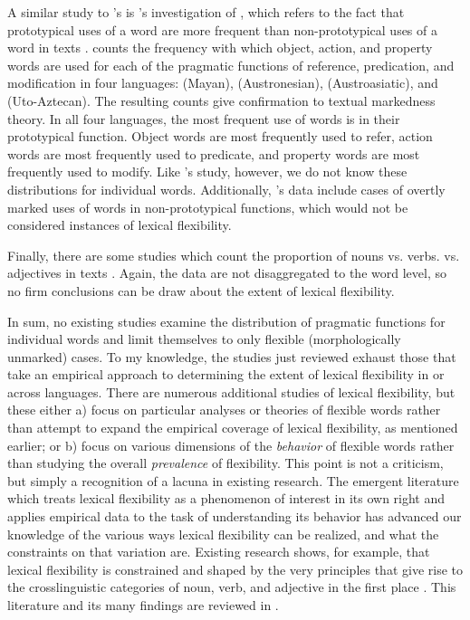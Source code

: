 A similar study to \citeauthor{Thompson1989}'s is \citeauthor{Croft1991}'s \parencite*[§2.5]{Croft1991} investigation of , which refers to the fact that prototypical uses of a word are more frequent than non-prototypical uses of a word in texts . \citeauthor{Croft1991} counts the frequency with which object, action, and property words are used for each of the pragmatic functions of reference, predication, and modification in four languages:  (Mayan),  (Austronesian),  (Austroasiatic), and  (Uto-Aztecan). The resulting counts give confirmation to textual markedness theory. In all four languages, the most frequent use of words is in their prototypical function. Object words are most frequently used to refer, action words are most frequently used to predicate, and property words are most frequently used to modify. Like \citeauthor{Thompson1989}'s \parencite*{Thompson1989} study, however, we do not know these distributions for individual words. Additionally, \citeauthor{Croft1991}'s data include cases of overtly marked uses of words in non-prototypical functions, which would not be considered instances of lexical flexibility.

Finally, there are some studies which count the proportion of nouns vs. verbs. vs. adjectives in  texts \parencites{Hudson1994}{PolinskyMagyar2020}. Again, the data are not disaggregated to the word level, so no firm conclusions can be draw about the extent of lexical flexibility.

In sum, no existing studies examine the distribution of pragmatic functions for individual words and limit themselves to only flexible (morphologically unmarked) cases. To my knowledge, the studies just reviewed exhaust those that take an empirical approach to determining the extent of lexical flexibility in or across languages. There are numerous additional studies of lexical flexibility, but these either a) focus on particular analyses or theories of flexible words rather than attempt to expand the empirical coverage of lexical flexibility, as mentioned earlier; or b) focus on various dimensions of the \emph{behavior} of flexible words rather than studying the overall \emph{prevalence} of flexibility. This point is not a criticism, but simply a recognition of a lacuna in existing research. The emergent literature which treats lexical flexibility as a phenomenon of interest in its own right and applies empirical data to the task of understanding its behavior has advanced our knowledge of the various ways lexical flexibility can be realized, and what the constraints on that variation are. Existing research shows, for example, that lexical flexibility is constrained and shaped by the very principles that give rise to the crosslinguistic categories of noun, verb, and adjective in the first place \parencites{Croft2000}{Croft2005}{CroftLier2012}. This literature and its many findings are reviewed in .

